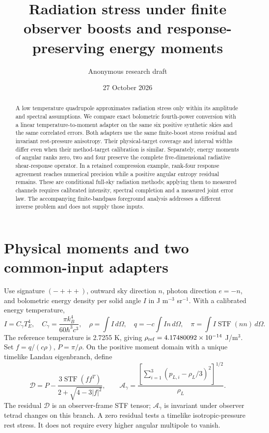 \documentclass[aps,prd,reprint,onecolumn,nofootinbib]{revtex4-2}
\begin{document}
\title{Radiation stress under finite observer boosts and
response-preserving energy
moments}
\author{Anonymous research draft}\noaffiliation
\date{27 October 2026}
\begin{abstract}
A low temperature quadrupole approximates radiation stress only within
its amplitude and spectral assumptions. We compare exact bolometric
fourth-power conversion with a linear temperature-to-moment adapter on
the same six positive synthetic skies and the same correlated errors.
Both adapters use the same finite-boost stress residual and invariant
rest-pressure anisotropy. Their physical-target coverage and interval
widths differ even when their method-target calibration is similar.
Separately, energy moments of angular ranks zero, two and four preserve
the complete five-dimensional radiative shear-response operator. In a
retained compression example, rank-four response agreement reaches
numerical precision while a positive angular entropy residual remains.
These are conditional full-sky radiation methods; applying them to
measured channels requires calibrated intensity, spectral completion and
a measured joint error law. The accompanying finite-bandpass foreground
analysis addresses a different inverse problem and does not supply those
inputs.
\end{abstract}\maketitle
\section{Physical moments and two common-input adapters}
Use signature \((-+++ )\), outward sky direction \(n\), photon direction
\(e=-n\), and bolometric energy density per solid angle \(I\) in J
m\(^{-3}\) sr\(^{-1}\). With a calibrated energy temperature, \[
 I=C_\gamma T_E^4,\quad C_\gamma=\frac{\pi k_B^4}{60\hbar^3c^3},\quad
 \rho=\int I\,d\Omega,\quad q=-c\int I n\,d\Omega,\quad
 \pi=\int I\operatorname{STF}(nn)\,d\Omega.
\] The reference temperature is 2.7255 K, giving
\(\rho_{\rm ref}=4.17480092\times10^{-14}\) J/m\(^3\). Set
\(f=q/(c\rho)\), \(P=\pi/\rho\). On the positive moment domain with a
unique timelike Landau eigenbranch, define \[
 \mathscr D=P-\frac{3\operatorname{STF}(ff^T)}{2+\sqrt{4-3|f|^2}},\qquad
 \mathcal A_\gamma=\frac{[\sum_{i=1}^3(p_{L,i}-\rho_L/3)^2]^{1/2}}{\rho_L}.
\] The residual \(\mathscr D\) is an observer-frame STF tensor;
\(\mathcal A_\gamma\) is invariant under observer tetrad changes on this
branch. A zero residual tests a timelike isotropic-pressure rest stress.
It does not require every higher angular multipole to vanish.
\end{document}
